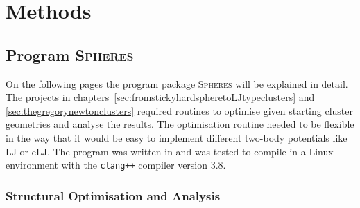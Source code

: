 
\part{Methods}
\label{sec:methods}

\chapter{Program \textsc{Spheres}}
\label{sec:theprogramspheres}

On the following pages the program package \textsc{Spheres} will be explained
in detail. The projects in
chapters~\ref{sec:fromstickyhardspheretoLJtypeclusters} and
\ref{sec:thegregorynewtonclusters} required routines to optimise given starting
cluster geometries and analyse the results. The optimisation routine needed to
be flexible in the way that it would be easy to implement different two-body
potentials like \ac{LJ} or \ac{eLJ}. The program was written in \Cpp
and was tested to compile in a Linux environment with the \texttt{clang++}
compiler version 3.8.

\section{Structural Optimisation and Analysis}
\label{sec:generalstructure}

